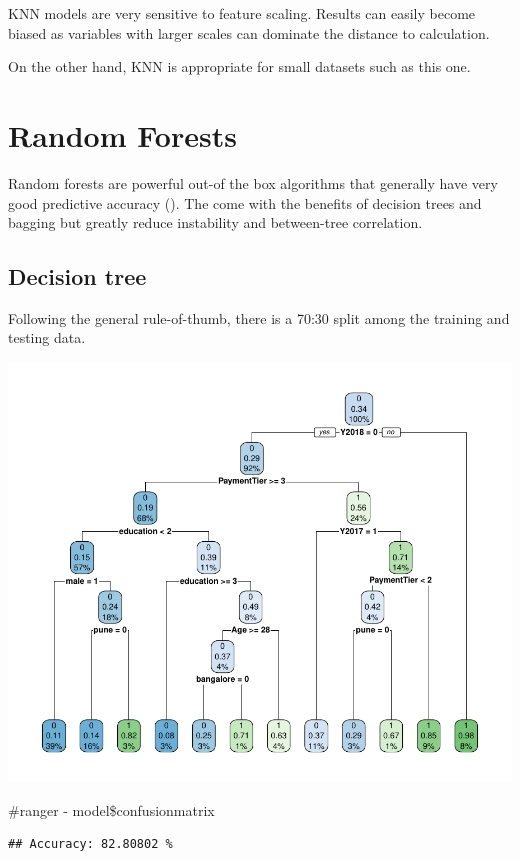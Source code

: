 \documentclass[11pt,preprint, authoryear]{elsarticle}
\numberwithin{equation}{section}
\numberwithin{figure}{section}
\numberwithin{table}{section}
\begin{document}
KNN models are very sensitive to feature scaling. Results can easily
become biased as variables with larger scales can dominate the distance
to calculation.

On the other hand, KNN is appropriate for small datasets such as this
one.

\hypertarget{random-forests}{%
\section*{Random Forests}\label{random-forests}}

Random forests are powerful out-of the box algorithms that generally
have very good predictive accuracy (). The come with the benefits of
decision trees and bagging but greatly reduce instability and
between-tree correlation.

\hypertarget{decision-tree}{%
\subsection*{Decision tree}\label{decision-tree}}

Following the general rule-of-thumb, there is a 70:30 split among the
training and testing data.

\includegraphics{Final_project_files/figure-latex/unnamed-chunk-12-1.pdf}

\#ranger - model\$confusionmatrix

\begin{verbatim}
## Accuracy: 82.80802 %
\end{verbatim}
\end{document}
